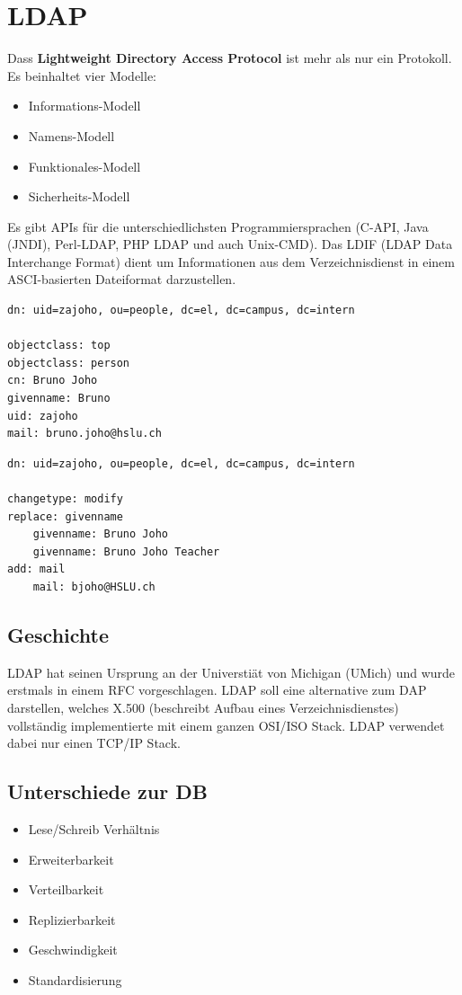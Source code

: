 \section{LDAP}
Dass \textbf{Lightweight Directory Access Protocol} ist mehr als nur ein Protokoll. Es beinhaltet vier Modelle:
\begin{itemize}
	\item Informations-Modell
	\item Namens-Modell
	\item Funktionales-Modell
	\item Sicherheits-Modell
\end{itemize}
Es gibt APIs für die unterschiedlichsten Programmiersprachen (C-API, Java (JNDI), Perl-LDAP, PHP LDAP und auch Unix-CMD). Das LDIF (LDAP Data Interchange Format) dient um Informationen aus dem Verzeichnisdienst in einem ASCI-basierten Dateiformat darzustellen.

\begin{lstlisting}[caption=Beispiel LDIF]
dn: uid=zajoho, ou=people, dc=el, dc=campus, dc=intern

objectclass: top
objectclass: person
cn: Bruno Joho
givenname: Bruno
uid: zajoho
mail: bruno.joho@hslu.ch
\end{lstlisting}


\begin{lstlisting}[caption=Beispiel LDIF Update]
dn: uid=zajoho, ou=people, dc=el, dc=campus, dc=intern

changetype: modify
replace: givenname
	givenname: Bruno Joho
	givenname: Bruno Joho Teacher
add: mail
	mail: bjoho@HSLU.ch
\end{lstlisting}

\subsection{Geschichte}
LDAP hat seinen Ursprung an der Universtiät von Michigan (UMich) und wurde erstmals in einem RFC vorgeschlagen. LDAP soll eine alternative zum DAP darstellen, welches X.500 (beschreibt Aufbau eines Verzeichnisdienstes) vollständig implementierte mit einem ganzen OSI/ISO Stack. LDAP verwendet dabei nur einen TCP/IP Stack.

\subsection{Unterschiede zur DB}
\begin{itemize}
	\item Lese/Schreib Verhältnis
	\item Erweiterbarkeit
	\item Verteilbarkeit
	\item Replizierbarkeit
	\item Geschwindigkeit
	\item Standardisierung 
\end{itemize}

